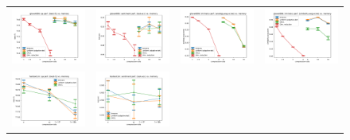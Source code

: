 \begin{figure}
	\centering
	\begin{tabular}{@{\hskip -0.0in}c@{\hskip -0.0in}c@{\hskip -0.0in}c@{\hskip -0.0in}c@{\hskip -0.0in}}
		\includegraphics[width=.245\linewidth]{figures/glove400k_qa_best-f1_vs_compression.pdf} &
		\includegraphics[width=.245\linewidth]{figures/glove400k_sentiment_trec_test-acc_vs_compression.pdf} &
		\includegraphics[width=.245\linewidth]{figures/glove400k_intrinsics_analogy-avg-score_vs_compression.pdf} &
		\includegraphics[width=.245\linewidth]{figures/glove400k_intrinsics_similarity-avg-score_vs_compression.pdf} \\
		\includegraphics[width=.245\linewidth]{figures/fasttext1m_qa_best-f1_vs_compression.pdf} &
		\includegraphics[width=.245\linewidth]{figures/fasttext1m_sentiment_trec_test-acc_vs_compression.pdf} &

\end{tabular}
\end{figure}
